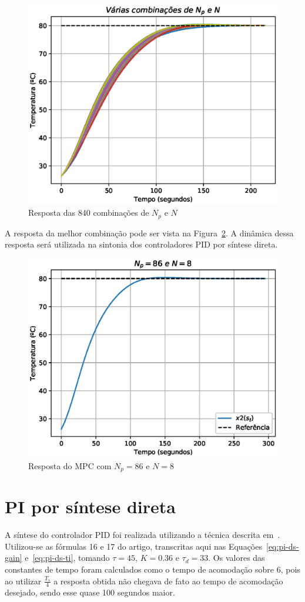 \begin{figure}[ht!]
	\centering
	\captionsetup{justification=centering}
	\includegraphics[height=0.5\linewidth]{imgs/mpc-set}
	\caption{Resposta das 840 combinações de \(N_p\) e \(N\)}%
	\label{fig:mpc-set}
\end{figure}

A resposta da melhor combinação pode ser vista na Figura~\ref{fig:mpc-best}. A
dinâmica dessa resposta será utilizada na sintonia dos controladores PID por
síntese direta.

\begin{figure}[ht!]
	\centering
	\captionsetup{justification=centering}
	\includegraphics[height=0.5\linewidth]{imgs/mpc-best}
	\caption{Resposta do MPC com \(N_p=86\) e \(N=8\)}%
	\label{fig:mpc-best}
\end{figure}

\section{PI por síntese direta}%
\label{sec:pi-ds}

A síntese do controlador PID foi realizada utilizando a técnica descrita
em~\textcite{article:seborg}. Utilizou-se as fórmulas 16 e 17 do artigo,
transcritas aqui nas Equações~\eqref{eq:pi-ds-gain} e~\eqref{eq:pi-ds-ti},
tomando \(\tau{}=45\), \(K=0.36\) e \(\tau{}_d=33\). Os valores das constantes
de tempo foram calculados como o tempo de acomodação sobre 6, pois ao utilizar
\(\frac{T_s}{4}\) a resposta obtida não chegava de fato ao tempo de acomodação
desejado, sendo esse quase 100 segundos maior.

